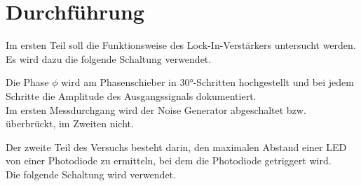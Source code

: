 \section{Durchführung}
\label{sec:Durchführung}


Im ersten Teil soll die Funktionsweise des Lock-In-Verstärkers untersucht werden.\\

Es wird dazu die folgende Schaltung verwendet.


Die Phase $\phi$ wird am Phasenschieber in 30°-Schritten hochgestellt und bei jedem Schritte
die Amplitude des Ausgangssignals dokumentiert.\\

Im ersten Messdurchgang wird der Noise Generator abgeschaltet bzw. überbrückt, im Zweiten nicht.

Der zweite Teil des Versuchs besteht darin, den maximalen Abstand
einer LED von einer Photodiode zu ermitteln, bei dem die Photodiode getriggert wird.\\
Die folgende Schaltung wird verwendet.


